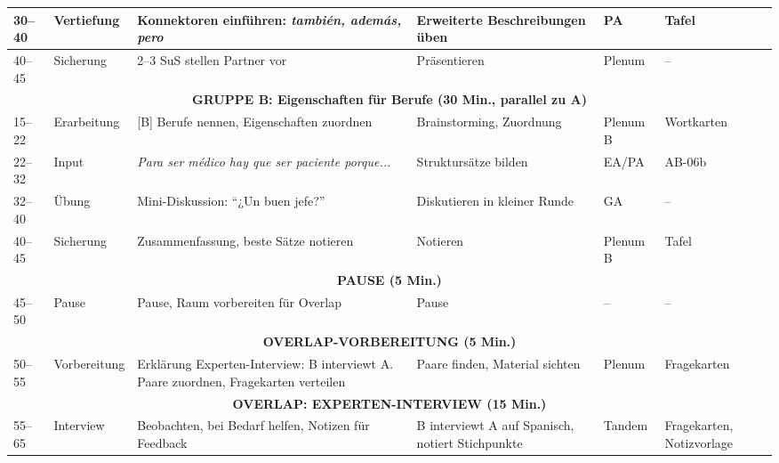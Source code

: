 \documentclass[11pt,a4paper]{article}
\begin{document}
\begin{longtable}{|p{0.8cm}|p{1.5cm}|p{4cm}|p{3cm}|p{1.5cm}|p{2cm}|}
30--40 & Vertiefung & \textcolor{gruppeA}{Konnektoren einführen: \textit{también, además, pero}} & \textcolor{gruppeA}{Erweiterte Beschreibungen üben} & PA & Tafel \\
\hline

40--45 & Sicherung & \textcolor{gruppeA}{2--3 SuS stellen Partner vor} & \textcolor{gruppeA}{Präsentieren} & Plenum & -- \\
\hline

\multicolumn{6}{|c|}{\textcolor{gruppeB}{\textbf{GRUPPE B: Eigenschaften für Berufe (30 Min., parallel zu A)}}} \\
\hline

15--22 & Erarbeitung & \textcolor{gruppeB}{[B] Berufe nennen, Eigenschaften zuordnen} & \textcolor{gruppeB}{Brainstorming, Zuordnung} & Plenum B & Wortkarten \\
\hline

22--32 & Input & \textcolor{gruppeB}{\textit{Para ser médico hay que ser paciente porque...}} & \textcolor{gruppeB}{Struktursätze bilden} & EA/PA & AB-06b \\
\hline

32--40 & Übung & \textcolor{gruppeB}{Mini-Diskussion: ``¿Un buen jefe?''} & \textcolor{gruppeB}{Diskutieren in kleiner Runde} & GA & -- \\
\hline

40--45 & Sicherung & \textcolor{gruppeB}{Zusammenfassung, beste Sätze notieren} & \textcolor{gruppeB}{Notieren} & Plenum B & Tafel \\
\hline

\multicolumn{6}{|c|}{\textbf{PAUSE (5 Min.)}} \\
\hline

45--50 & Pause & Pause, Raum vorbereiten für Overlap & Pause & -- & -- \\
\hline

\multicolumn{6}{|c|}{\textbf{OVERLAP-VORBEREITUNG (5 Min.)}} \\
\hline

50--55 & Vorbereitung & Erklärung Experten-Interview: B interviewt A. Paare zuordnen, Fragekarten verteilen & Paare finden, Material sichten & Plenum & Fragekarten \\
\hline

\multicolumn{6}{|c|}{\textcolor{overlap}{\textbf{OVERLAP: EXPERTEN-INTERVIEW (15 Min.)}}} \\
\hline

55--65 & \textcolor{overlap}{Interview} & \textcolor{overlap}{Beobachten, bei Bedarf helfen, Notizen für Feedback} & \textcolor{overlap}{B interviewt A auf Spanisch, notiert Stichpunkte} & \textcolor{overlap}{Tandem} & \textcolor{overlap}{Fragekarten, Notizvorlage} \\
\hline


\end{longtable}
\end{document}
